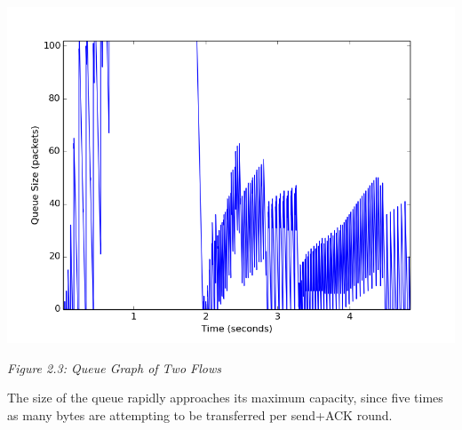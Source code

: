 \documentclass[11pt]{article}
\begin{document}
\includegraphics[width=17cm]{outputs/fiveflows/fiveflows_queue.png}

\centerline{\emph{Figure 2.3: Queue Graph of Two Flows}}

The size of the queue rapidly approaches its maximum capacity, since five times as many bytes are attempting to be transferred per send+ACK round.






\end{document}
